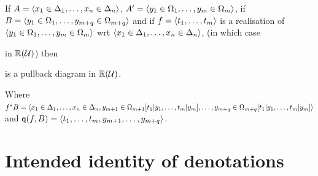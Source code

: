   If $A = \langle x_1 \in \Delta_1, \dots, x_n \in \Delta_n \rangle$, $A' = \langle y_1 \in \Omega_1, \dots, y_m \in \Omega_m \rangle$, if $B = \langle y_1 \in \Omega_1, \dots, y_{m+q} \in \Omega_{m+q} \rangle$ and if $f = \langle t_1, \dots, t_m \rangle$ is a realisation of $\langle y_1 \in \Omega_1, \dots, y_m \in \Omega_m \rangle$ wrt $\langle x_1 \in \Delta_1, \dots, x_n \in \Delta_n \rangle$, (in which case
    \begin{center}
      \qquad
    \end{center}
  in $\mathbb{R}(\mathcal{U})$) then
  \begin{center}
  \end{center}
  is a pullback diagram in $\mathbb{R}(\mathcal{U})$.

  Where $f^*B = \langle x_1 \in \Delta_1, \dots, x_n \in \Delta_n, y_{m+1} \in \Omega_{m+1}[t_1|y_1, \dots, t_m|y_m], \dots, y_{m+q} \in \Omega_{m+q}[t_1|y_1, \dots, t_m|y_m] \rangle$ and $\mathsf{q}(f,B) = \langle t_1, \dots, t_m, y_{m+1}, \dots, y_{m+q} \rangle$.

  \section{Intended identity of denotations} \label{sec:source-1-13}

